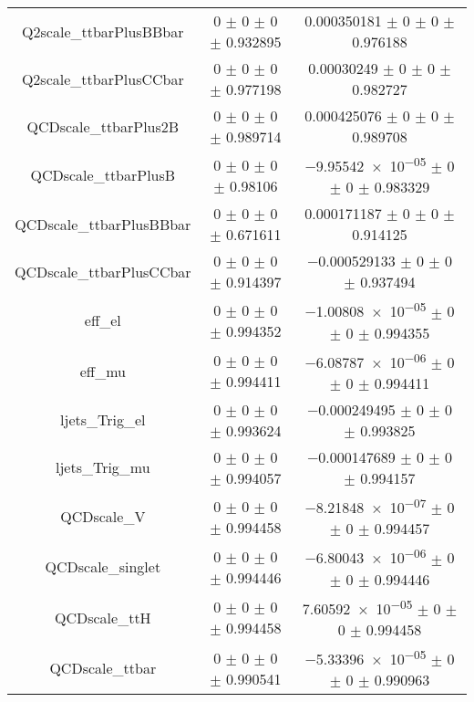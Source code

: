\begin{table}
\begin{tabular}{ccc}
Q2scale\_ttbarPlusBBbar & \num{0} $\pm$ \num{0} $\pm$ \num{0} $\pm$ \num{0.932895} & \num{0.000350181} $\pm$ \num{0} $\pm$ \num{0} $\pm$ \num{0.976188}\\
Q2scale\_ttbarPlusCCbar & \num{0} $\pm$ \num{0} $\pm$ \num{0} $\pm$ \num{0.977198} & \num{0.00030249} $\pm$ \num{0} $\pm$ \num{0} $\pm$ \num{0.982727}\\
QCDscale\_ttbarPlus2B & \num{0} $\pm$ \num{0} $\pm$ \num{0} $\pm$ \num{0.989714} & \num{0.000425076} $\pm$ \num{0} $\pm$ \num{0} $\pm$ \num{0.989708}\\
QCDscale\_ttbarPlusB & \num{0} $\pm$ \num{0} $\pm$ \num{0} $\pm$ \num{0.98106} & \num{-9.95542e-05} $\pm$ \num{0} $\pm$ \num{0} $\pm$ \num{0.983329}\\
QCDscale\_ttbarPlusBBbar & \num{0} $\pm$ \num{0} $\pm$ \num{0} $\pm$ \num{0.671611} & \num{0.000171187} $\pm$ \num{0} $\pm$ \num{0} $\pm$ \num{0.914125}\\
QCDscale\_ttbarPlusCCbar & \num{0} $\pm$ \num{0} $\pm$ \num{0} $\pm$ \num{0.914397} & \num{-0.000529133} $\pm$ \num{0} $\pm$ \num{0} $\pm$ \num{0.937494}\\
eff\_el & \num{0} $\pm$ \num{0} $\pm$ \num{0} $\pm$ \num{0.994352} & \num{-1.00808e-05} $\pm$ \num{0} $\pm$ \num{0} $\pm$ \num{0.994355}\\
eff\_mu & \num{0} $\pm$ \num{0} $\pm$ \num{0} $\pm$ \num{0.994411} & \num{-6.08787e-06} $\pm$ \num{0} $\pm$ \num{0} $\pm$ \num{0.994411}\\
ljets\_Trig\_el & \num{0} $\pm$ \num{0} $\pm$ \num{0} $\pm$ \num{0.993624} & \num{-0.000249495} $\pm$ \num{0} $\pm$ \num{0} $\pm$ \num{0.993825}\\
ljets\_Trig\_mu & \num{0} $\pm$ \num{0} $\pm$ \num{0} $\pm$ \num{0.994057} & \num{-0.000147689} $\pm$ \num{0} $\pm$ \num{0} $\pm$ \num{0.994157}\\
QCDscale\_V & \num{0} $\pm$ \num{0} $\pm$ \num{0} $\pm$ \num{0.994458} & \num{-8.21848e-07} $\pm$ \num{0} $\pm$ \num{0} $\pm$ \num{0.994457}\\
QCDscale\_singlet & \num{0} $\pm$ \num{0} $\pm$ \num{0} $\pm$ \num{0.994446} & \num{-6.80043e-06} $\pm$ \num{0} $\pm$ \num{0} $\pm$ \num{0.994446}\\
QCDscale\_ttH & \num{0} $\pm$ \num{0} $\pm$ \num{0} $\pm$ \num{0.994458} & \num{7.60592e-05} $\pm$ \num{0} $\pm$ \num{0} $\pm$ \num{0.994458}\\
QCDscale\_ttbar & \num{0} $\pm$ \num{0} $\pm$ \num{0} $\pm$ \num{0.990541} & \num{-5.33396e-05} $\pm$ \num{0} $\pm$ \num{0} $\pm$ \num{0.990963}\\

\end{tabular}
\end{table}
